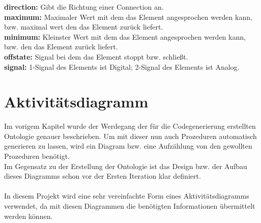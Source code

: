 \textbf{direction: }Gibt die Richtung einer Connection an.\\

\textbf{maximum: }Maximaler Wert mit dem das Element angesprochen werden kann, bzw. maximal wert den das Element zurück liefert.\\

\textbf{minimum: }Kleinster Wert mit dem das Element angesprochen werden kann, bzw. den das Element zurück liefert.\\

\textbf{offstate: }Signal bei dem das Element stoppt bzw. schließt.\\

\textbf{signal: }1-Signal des Elements ist Digital; 2-Signal des Elements ist Analog.\\

\section{Aktivitätsdiagramm}
Im vorigem Kapitel wurde der Werdegang der für die Codegenerierung erstellten Ontologie genauer beschrieben. Um mit dieser nun auch Prozeduren automatisch generieren zu lassen, wird ein Diagram bzw. eine Aufzählung von den gewollten Prozeduren benötigt.\\
Im Gegensatz zu der Erstellung der Ontologie ist das Design bzw. der Aufbau dieses Diagramms schon vor der Ersten Iteration klar definiert.\\
\\
In diesem Projekt wird eine sehr vereinfachte Form eines Aktivitätsdiagramms verwendet, da mit diesen Diagrammen die benötigten Informationen übermittelt werden können.\\

